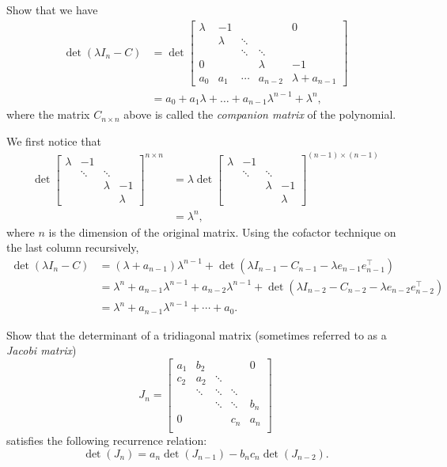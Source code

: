 
Show that we have
\begin{align*}
\det(\lambda I_n - C) &= \det \begin{bmatrix}
\lambda & -1 & & & 0\\
& \lambda & \ddots & & \\
&& \ddots & \ddots &\\
0 &&& \lambda & -1\\
a_0 & a_1 & \cdots & a_{n-2} & \lambda + a_{n-1}
\end{bmatrix}\\
&= a_0 + a_1 \lambda + \dots + a_{n-1}\lambda^{n-1} + \lambda^n,
\end{align*}
where the matrix \(C_{n \times n}\) above is called the \emph{companion matrix} of the polynomial.

\begin{solution}
  We first notice that
  \begin{align*}
    \det\begin{bmatrix}
      \lambda & -1 &\\
      & \ddots & \ddots\\
      & & \lambda & -1\\
      & & & \lambda
    \end{bmatrix}^{n \times n}
    & =
    \lambda
    \det\begin{bmatrix}
      \lambda & -1 &\\
              & \ddots & \ddots\\
              & & \lambda & -1\\
              & & & \lambda
    \end{bmatrix}^{(n-1) \times (n-1)} \\
    & = \lambda^n,
  \end{align*}
  where $n$ is the dimension of the original matrix.
  Using the cofactor technique on the last column recursively,
  \begin{align*}
    \det(\lambda I_n - C) & = (\lambda + a_{n-1})\lambda^{n-1}
    + \det(\lambda I_{n-1} - C_{n-1} - \lambda e_{n-1}e_{n-1}^\top)\\
    & =
    \lambda^n + a_{n-1}\lambda^{n-1}
    + a_{n-2} \lambda^{n-1}
    + \det(\lambda I_{n-2} - C_{n-2} - \lambda e_{n-2}e_{n-2}^\top)\\
    & = \lambda^n + a_{n-1}\lambda^{n-1} + \cdots + a_0.
  \end{align*}
\end{solution}

Show that the determinant of a tridiagonal matrix (sometimes referred to as a \emph{Jacobi matrix})
\[
J_n = \begin{bmatrix}
a_1 & b_2 & & & 0\\
c_2 & a_2 & \ddots & & \\
& \ddots & \ddots & \ddots &\\
&& \ddots & \ddots & b_n\\
0 &&& c_n & a_n\\
\end{bmatrix}
\]
satisfies the following recurrence relation:
\[
\det(J_n) = a_n \det(J_{n-1}) - b_n c_n \det(J_{n-2}).
\]

